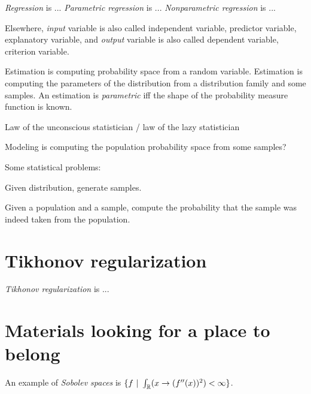 \emph{Regression} is ...
\emph{Parametric regression} is ...
\emph{Nonparametric regression} is ...

Elsewhere,
%
%
%
%
%
%
%
%
\emph{input}
variable is also called independent variable, predictor variable, explanatory variable,
and
%
%
%
%
%
%
\emph{output} variable is also called dependent variable, criterion variable.

Estimation is computing probability space from a random variable.
Estimation is computing the parameters of the distribution from a distribution family and some samples.
An estimation is \emph{parametric} iff the shape of the probability measure function is known.

Law of the unconscious statistician / law of the lazy statistician

Modeling is computing the population probability space from some samples?

Some statistical problems:
\begin{enumerate*}[label={(\arabic*)}]
    \item Given distribution, generate samples.
    \item
Given a population and a sample, compute the probability that
the sample was indeed taken from the population.
\end{enumerate*}

\section{Tikhonov regularization}

\emph{Tikhonov regularization} is ...

\section{Materials looking for a place to belong}

%
An example of \emph{Sobolev spaces} is \( \{ f ~|~ \int_{\mathbb{R}} (x \to (f''(x))^2) < \infty \} \).
